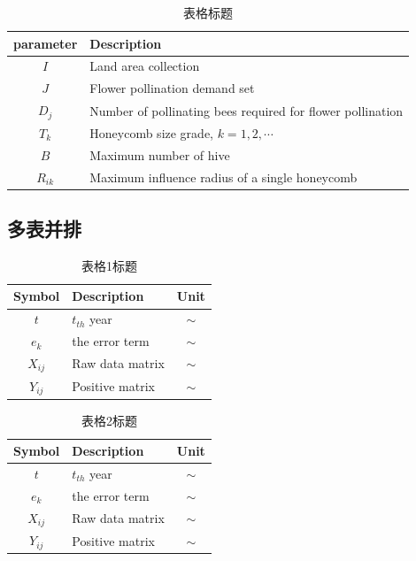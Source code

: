 \documentclass[12pt, a4paper]{article}
\begin{document}
\begin{table}[H]
    \centering
    \caption{表格标题}
        \begin{tabular}{c||l}
        \toprule
        parameter  & Description \\
        \midrule
        $I$ & Land area collection \\
        $J$ & Flower pollination demand set \\
        $D_j$ & Number of pollinating bees required for flower pollination \\
        $T_k$ & Honeycomb size grade, $k = 1, 2, \cdots$ \\
        $B$ & Maximum number of hive \\
        $R_{ik}$ & Maximum influence radius of a single honeycomb \\
        \bottomrule
        \end{tabular}%
    \label{tab: 一个表}%
\end{table}%

\subsection{多表并排}

\begin{minipage}[c]{0.45\textwidth}
    \centering
    \begin{table}[H]
        \centering
        \caption{表格1标题}
            \begin{tabular}{c||lc}
            \toprule
            Symbol  & Description & Unit \\
            \midrule
            $t$ & $t_{th}$ year & $\sim$ \\
            $e_k$ & the error term & $\sim$ \\
            $X_{ij}$ & Raw data matrix & $\sim$ \\
            $Y_{ij}$ & Positive matrix & $\sim$ \\
            \bottomrule
            \end{tabular}%
        \label{tab: 表格1标题}%
    \end{table}%
\end{minipage}
\begin{minipage}[c]{0.45\textwidth}
    \centering
    \begin{table}[H]
        \centering
        \caption{表格2标题}
            \begin{tabular}{c||lc}
            \toprule
            Symbol  & Description & Unit \\
            \midrule
            $t$ & $t_{th}$ year & $\sim$ \\
            $e_k$ & the error term & $\sim$ \\
            $X_{ij}$ & Raw data matrix & $\sim$ \\
            $Y_{ij}$ & Positive matrix & $\sim$ \\
            \bottomrule
            \end{tabular}%
        \label{tab: 表格2标题}%
    \end{table}%
\end{minipage}
\end{document}
